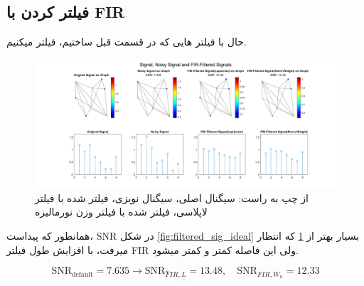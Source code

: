 \subsection{فیلتر کردن با FIR}
حال با فیلتر هایی که در قسمت قبل ساختیم، فیلتر میکنیم.
\begin{figure}[h]
	\centering
	\includegraphics*[width=\linewidth]{../results/Q1/FIR-filtering.png}
	\vspace*{-2em}
	\caption{از چپ به راست: سیگنال اصلی، سیگنال نویزی، فیلتر شده با فیلتر لاپلاسی، فیلتر شده با فیلتر وزن نورمالیزه}
	\label{fig:filtered_sig_FIR}
\end{figure}

همانطور که پیداست، SNR در شکل \ref*{fig:filtered_sig_ideal} بسیار بهتر از \ref*{fig:filtered_sig_FIR} که انتظار میرفت،
با اقزایش طول فیلتر FIR ولی این فاصله کمتر و کمتر میشود.

\[
	\text{SNR}_{\text{default}}=7.635\longrightarrow \underline{\text{SNR}_{ّFIR,L}=13.48},\quad \text{SNR}_{FIR,W_n}=12.33
\]